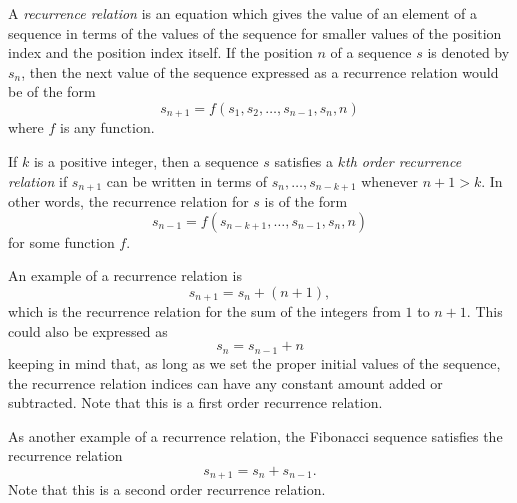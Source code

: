 \documentclass{article}
\begin{document}

A \emph{recurrence relation} is an equation which gives the value of an element of a sequence in terms of the values of the sequence for smaller values of the position index and the position index itself.  If the  position $n$ of a sequence $s$ is denoted by $s_n$, then the next value of the sequence expressed as a recurrence relation would be of the form
$$ s_{n+1} = f(s_1,s_2,\ldots,s_{n-1},s_n,n) $$
where $f$ is any function.

If $k$ is a positive integer, then a sequence $s$ satisfies a \emph{$k$th order recurrence relation} if $s_{n+1}$ can be written in terms of $s_n,\dots,s_{n-k+1}$ whenever $n+1>k$.  In other words, the recurrence relation for $s$ is of the form
$$ s_{n-1} = f(s_{n-k+1},\dots,s_{n-1},s_n,n) $$
for some function $f$.

An example of a  recurrence relation is
$$ s_{n+1} = s_n + (n+1), $$
which is the recurrence relation for the sum of the integers from $1$ to $n+1$.  This could also be expressed as 
$$ s_n = s_{n-1} + n $$
keeping in mind that, as long as we set the proper initial values of the sequence, the recurrence relation indices can have any constant amount added or subtracted.  Note that this is a first order recurrence relation.

As another example of a recurrence relation, the Fibonacci sequence satisfies the recurrence relation
$$ s_{n+1} = s_n + s_{n-1}. $$
Note that this is a second order recurrence relation.
\end{document}
